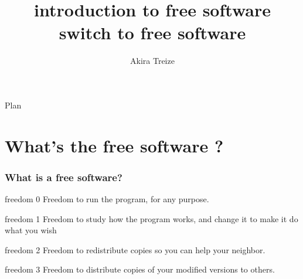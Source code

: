 \documentclass[11pt,hyperref={pdfpagemode=FullScreen}]{beamer}
\title[Join us now and share the software you'll be free]{introduction to free software\\switch to free software}
\author{Akira Treize}
\institute{ESPRIT Libre}
\begin{document}
\begin{frame}
 \titlepage
\begin{center}
\end{center}

\end{frame}

\begin{frame} 
	\begin{center}{\Large Plan }\end{center}
	\tableofcontents[hideallsubsections]
\end{frame}

\section{What's the free software ?}
\begin{frame}
\frametitle{What is a free software?}


\pause \begin{block}{freedom 0}
 Freedom \alert{to run} the program, for any purpose.
\end{block}

\pause \begin{block}{freedom 1}
 Freedom \alert{to study} how the program works, and change it \alert {to make} it do what you wish
\end{block}

\pause \begin{block}{freedom 2}
  Freedom \alert {to redistribute} copies so you can help your neighbor.
 \end{block}

\pause \begin{block}{freedom 3}
Freedom \alert {to distribute} copies of your modified versions to others. 
\end{block}


\end{frame}

\end{document}
